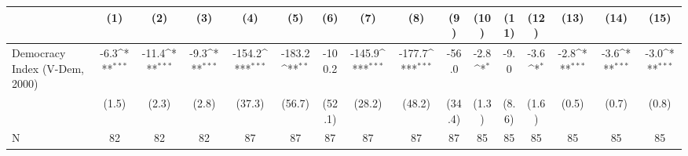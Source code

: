 {
\def\sym#1{\ifmmode^{#1}\else\(^{#1}\)\fi}
\begin{tabular}{l*{15}{c}}
\hline\hline
                    &\multicolumn{1}{c}{(1)}         &\multicolumn{1}{c}{(2)}         &\multicolumn{1}{c}{(3)}         &\multicolumn{1}{c}{(4)}         &\multicolumn{1}{c}{(5)}         &\multicolumn{1}{c}{(6)}         &\multicolumn{1}{c}{(7)}         &\multicolumn{1}{c}{(8)}         &\multicolumn{1}{c}{(9)}         &\multicolumn{1}{c}{(10)}         &\multicolumn{1}{c}{(11)}         &\multicolumn{1}{c}{(12)}         &\multicolumn{1}{c}{(13)}         &\multicolumn{1}{c}{(14)}         &\multicolumn{1}{c}{(15)}         \\
\hline
Democracy Index (V-Dem, 2000)&        -6.3\sym{***}&       -11.4\sym{***}&        -9.3\sym{***}&      -154.2\sym{***}&      -183.2\sym{**} &      -100.2         &      -145.9\sym{***}&      -177.7\sym{***}&       -56.0         &        -2.8\sym{*}  &        -9.0         &        -3.6\sym{*}  &        -2.8\sym{***}&        -3.6\sym{***}&        -3.0\sym{***}\\
                    &       (1.5)         &       (2.3)         &       (2.8)         &      (37.3)         &      (56.7)         &      (52.1)         &      (28.2)         &      (48.2)         &      (34.4)         &       (1.3)         &       (8.6)         &       (1.6)         &       (0.5)         &       (0.7)         &       (0.8)         \\
\hline
N                   &          82         &          82         &          82         &          87         &          87         &          87         &          87         &          87         &          87         &          85         &          85         &          85         &          85         &          85         &          85         \\
\hline\hline
\end{tabular}
}
